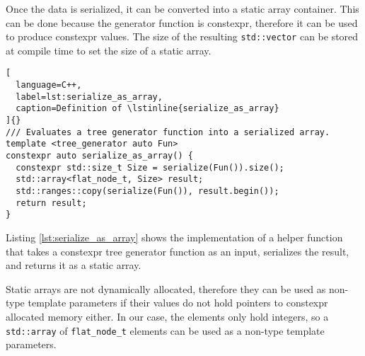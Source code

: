 \documentclass[../main]{subfiles}
\begin{document}
Once the data is serialized, it can be converted into a static array container.
This can be done because the generator function is \gls{constexpr}, therefore it
can be used to produce \gls{constexpr} values. The size of the resulting
\lstinline{std::vector} can be stored at compile time to set the size
of a static array.

\begin{lstlisting}[
  language=C++,
  label=lst:serialize_as_array,
  caption=Definition of \lstinline{serialize_as_array}
]{}
/// Evaluates a tree generator function into a serialized array.
template <tree_generator auto Fun>
constexpr auto serialize_as_array() {
  constexpr std::size_t Size = serialize(Fun()).size();
  std::array<flat_node_t, Size> result;
  std::ranges::copy(serialize(Fun()), result.begin());
  return result;
}
\end{lstlisting}

Listing \ref{lst:serialize_as_array} shows the implementation of a helper
function that takes a \gls{constexpr} tree generator function as an input,
serializes the result, and returns it as a static array.

Static arrays are not dynamically allocated, therefore they can be used as
non-type template parameters if their values do not hold pointers to
\gls{constexpr} allocated memory either.
In our case, the elements only hold integers, so a \lstinline{std::array} of
\lstinline{flat_node_t} elements can be used as a non-type template parameters.
\end{document}
